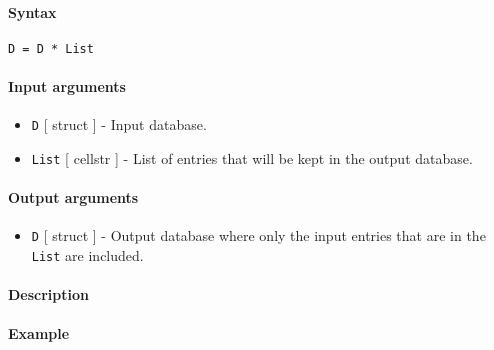 


	\paragraph{Syntax}

\begin{verbatim}
D = D * List
\end{verbatim}

\paragraph{Input arguments}

\begin{itemize}
\item
  \texttt{D} {[} struct {]} - Input database.
\item
  \texttt{List} {[} cellstr {]} - List of entries that will be kept in
  the output database.
\end{itemize}

\paragraph{Output arguments}

\begin{itemize}
\itemsep1pt\parskip0pt
\item
  \texttt{D} {[} struct {]} - Output database where only the input
  entries that are in the \texttt{List} are included.
\end{itemize}

\paragraph{Description}

\paragraph{Example}



